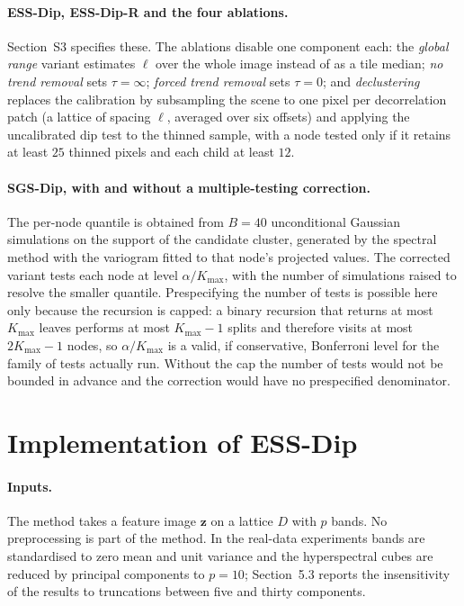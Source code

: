 \documentclass[11pt]{article}
\begin{document}
\paragraph{ESS-Dip, ESS-Dip-R and the four ablations.}
Section~S3 specifies these. The ablations disable one component each: the
\emph{global range} variant estimates $\ell$ over the whole image instead of as
a tile median; \emph{no trend removal} sets $\tau=\infty$; \emph{forced trend
removal} sets $\tau=0$; and \emph{declustering} replaces the calibration by
subsampling the scene to one pixel per decorrelation patch (a lattice of
spacing $\ell$, averaged over six offsets) and applying the uncalibrated dip
test to the thinned sample, with a node tested only if it retains at least $25$
thinned pixels and each child at least $12$.

\paragraph{SGS-Dip, with and without a multiple-testing correction.}
The per-node quantile is obtained from $B=40$ unconditional Gaussian
simulations on the support of the candidate cluster, generated by the spectral
method with the variogram fitted to that node's projected values. The corrected
variant tests each node at level $\alpha/K_{\max}$, with the number of
simulations raised to resolve the smaller quantile. Prespecifying the number of
tests is possible here only because the recursion is capped: a binary recursion
that returns at most $K_{\max}$ leaves performs at most $K_{\max}-1$ splits and
therefore visits at most $2K_{\max}-1$ nodes, so $\alpha/K_{\max}$ is a valid,
if conservative, Bonferroni level for the family of tests actually run. Without
the cap the number of tests would not be bounded in advance and the correction
would have no prespecified denominator.

\section{Implementation of ESS-Dip}\label{sec:supp-impl}

\paragraph{Inputs.}
The method takes a feature image $\bm z$ on a lattice $D$ with $p$ bands. No
preprocessing is part of the method. In the real-data experiments bands are
standardised to zero mean and unit variance and the hyperspectral cubes are
reduced by principal components to $p=10$; Section~5.3 reports the
insensitivity of the results to truncations between five and thirty components.
\end{document}

